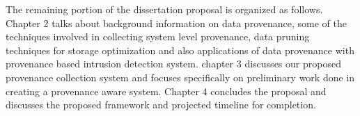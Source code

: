 The remaining portion of the dissertation proposal is organized as follows.  Chapter 2 talks about background information on data provenance, some of the techniques involved in collecting system level provenance, data pruning techniques for storage optimization and also applications of data provenance with provenance based intrusion detection system. chapter 3 discusses our proposed provenance collection system and focuses specifically on preliminary work done in creating a provenance aware system. Chapter 4 concludes the proposal and discusses the proposed framework and projected timeline for completion.

